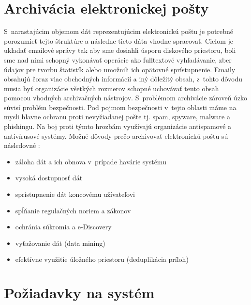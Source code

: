 \documentclass[11pt,twoside,a4paper]{book}
\begin{document}

\section{Archivácia elektronickej pošty}


S~narastajúcim objemom dát reprezentujúcim elektronickú poštu je potrebné porozumieť tejto štruktúre a následne tieto dáta vhodne spracovať. Cieľom je ukladať emailové správy tak aby sme dosiahli úsporu diskového priestoru, boli sme nad nimi schopný vykonávať operácie ako fulltextové vyhľadávanie, zber údajov pre tvorbu štatistík alebo umožnili ich opätovné sprístupnenie. Emaily obsahujú čoraz viac obchodných informácií a iný dôležitý obsah, z~tohto dôvodu musia byť organizácie všetkých rozmerov schopné uchovávať tento obsah pomocou vhodných archivačných nástrojov. S~problémom archivácie zároveň úzko súvisí problém bezpečnosti. Pod pojmom bezpečnosti v~tejto oblasti máme na mysli hlavne ochranu proti nevyžiadanej pošte tj. spam, spyware, malware a phishingu. Na boj proti týmto hrozbám využívajú organizácie antispamové a antivírusové systémy. Možné dôvody prečo archivovať elektronickú poštu sú následovné \cite{WhyArchiving}:
\begin{itemize}
 \item 
  záloha dát a ich obnova v~prípade havárie systému
 \item
  vysoká dostupnosť dát
 \item
  sprístupnenie dát koncovému užívateľovi
 \item
  spĺňanie regulačných noriem a zákonov
 \item
  ochránia súkromia a e-Discovery
 \item
  vyťažovanie dát (data mining)
 \item
  efektívne využitie úložného priestoru (deduplikácia príloh)
\end{itemize}


\section{Požiadavky na systém}
\end{document}
